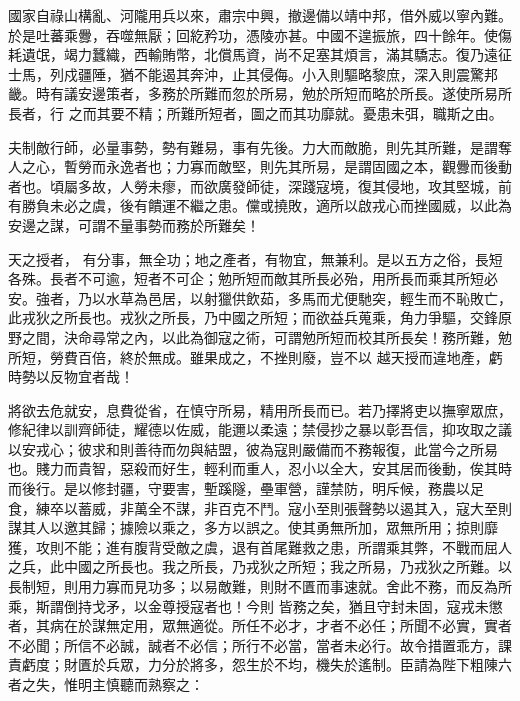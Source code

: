 \begin{pinyinscope}
 國家自祿山構亂、河隴用兵以來，肅宗中興，撤邊備以靖中邦，借外威以寧內難。於是吐蕃乘釁，吞噬無厭；回紇矜功，憑陵亦甚。中國不遑振旅，四十餘年。使傷耗遺氓，竭力蠶織，西輸賄幣，北償馬資，尚不足塞其煩言，滿其驕志。復乃遠征士馬，列戍疆陲，猶不能遏其奔沖，止其侵侮。小入則驅略黎庶，深入則震驚邦畿。時有議安邊策者，多務於所難而忽於所易，勉於所短而略於所長。遂使所易所長者，行
 之而其要不精；所難所短者，圖之而其功靡就。憂患未弭，職斯之由。



 夫制敵行師，必量事勢，勢有難易，事有先後。力大而敵脆，則先其所難，是謂奪人之心，暫勞而永逸者也；力寡而敵堅，則先其所易，是謂固國之本，觀釁而後動者也。頃屬多故，人勞未瘳，而欲廣發師徒，深踐寇境，復其侵地，攻其堅城，前有勝負未必之虞，後有饋運不繼之患。儻或撓敗，適所以啟戎心而挫國威，以此為安邊之謀，可謂不量事勢而務於所難矣！



 天之授者，
 有分事，無全功；地之產者，有物宜，無兼利。是以五方之俗，長短各殊。長者不可逾，短者不可企；勉所短而敵其所長必殆，用所長而乘其所短必安。強者，乃以水草為邑居，以射獵供飲茹，多馬而尤便馳突，輕生而不恥敗亡，此戎狄之所長也。戎狄之所長，乃中國之所短；而欲益兵蒐乘，角力爭驅，交鋒原野之間，決命尋常之內，以此為御寇之術，可謂勉所短而校其所長矣！務所難，勉所短，勞費百倍，終於無成。雖果成之，不挫則廢，豈不以
 越天授而違地產，虧時勢以反物宜者哉！



 將欲去危就安，息費從省，在慎守所易，精用所長而已。若乃擇將吏以撫寧眾庶，修紀律以訓齊師徒，耀德以佐威，能邇以柔遠；禁侵抄之暴以彰吾信，抑攻取之議以安戎心；彼求和則善待而勿與結盟，彼為寇則嚴備而不務報復，此當今之所易也。賤力而貴智，惡殺而好生，輕利而重人，忍小以全大，安其居而後動，俟其時而後行。是以修封疆，守要害，塹蹊隧，壘軍營，謹禁防，明斥候，務農以足
 食，練卒以蓄威，非萬全不謀，非百克不鬥。寇小至則張聲勢以遏其入，寇大至則謀其人以邀其歸；據險以乘之，多方以誤之。使其勇無所加，眾無所用；掠則靡獲，攻則不能；進有腹背受敵之虞，退有首尾難救之患，所謂乘其弊，不戰而屈人之兵，此中國之所長也。我之所長，乃戎狄之所短；我之所易，乃戎狄之所難。以長制短，則用力寡而見功多；以易敵難，則財不匱而事速就。舍此不務，而反為所乘，斯謂倒持戈矛，以金尊授寇者也！今則
 皆務之矣，猶且守封未固，寇戎未懲者，其病在於謀無定用，眾無適從。所任不必才，才者不必任；所聞不必實，實者不必聞；所信不必誠，誠者不必信；所行不必當，當者未必行。故令措置乖方，課責虧度；財匱於兵眾，力分於將多，怨生於不均，機失於遙制。臣請為陛下粗陳六者之失，惟明主慎聽而熟察之：




\end{pinyinscope}
